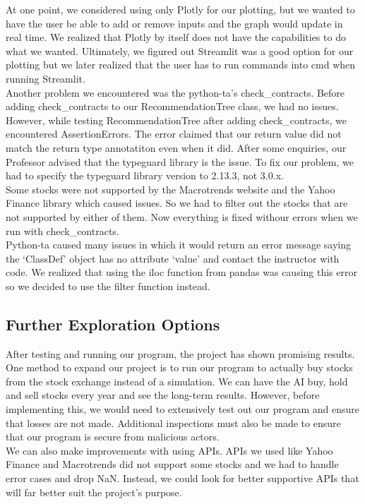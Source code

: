 \documentclass[fontsize=11pt]{article}
\begin{document}
At one point, we considered using only Plotly for our plotting, but we wanted to have the user be able to add or remove inputs and the graph would update in real time. We realized that Plotly by itself does not have the capabilities to do what we wanted. Ultimately, we figured out Streamlit was a good option for our plotting but we later realized that the user has to run commands into cmd when running Streamlit. 
\\

Another problem we encountered was the python-ta's check\_contracts. Before adding check\_contracts to our RecommendationTree class, we had no issues. However, while testing RecommendationTree after adding check\_contracts, we encountered AssertionErrors. The error claimed that our return value did not match the return type annotatiton even when it did. After some enquiries, our Professor advised that the typeguard library is the issue. To fix our problem, we had to specify the typeguard library version to 2.13.3, not 3.0.x.
\\
Some stocks were not supported by the Macrotrends website and the Yahoo Finance library which caused issues. So we had to filter out the stocks that are not supported by either of them. Now everything is fixed withour errors when we run with check\_contracts.
\\

Python-ta caused many issues in which it would return an error message saying the `ClassDef' object has no attribute `value' and contact the instructor with code. We realized that using the iloc function from pandas was causing this error so we decided to use the filter function instead.

\subsection{Further Exploration Options}
After testing and running our program, the project has shown promising results. One method to expand our project is to run our program to actually buy stocks from the stock exchange instead of a simulation. We can have the AI buy, hold and sell stocks every year and see the long-term results. However, before implementing this, we would need to extensively test out our program and ensure that losses are not made. Additional inspections must also be made to ensure that our program is secure from malicious actors.\\

We can also make improvements with using APIs. APIs we used like Yahoo Finance and Macrotrends did not support some stocks and we had to handle error cases and drop NaN. Instead, we could look for better supportive APIs that will far better suit the project's purpose.\\
\end{document}
